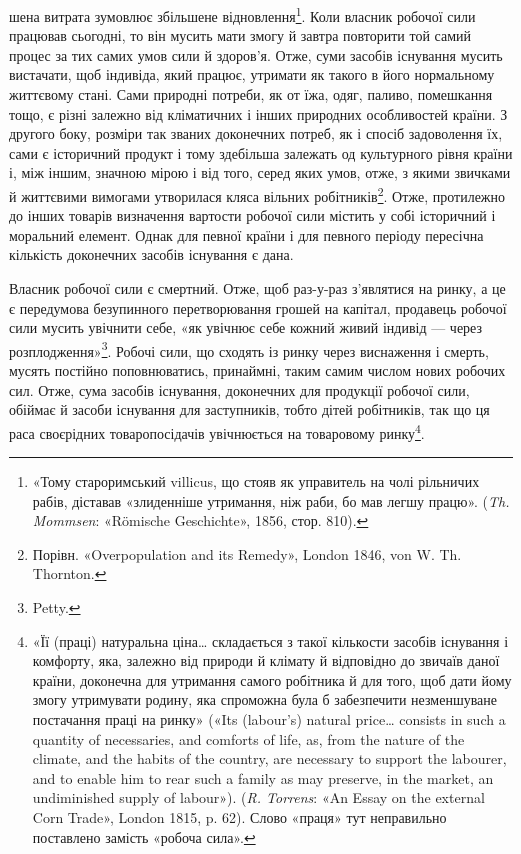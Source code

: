 \parcont{}  %
шена витрата зумовлює збільшене відновлення\footnote{
«Тому староримський villicus, що стояв як управитель на чолі
рільничих рабів, діставав «злиденніше утримання, ніж раби, бо мав
легшу працю». (\emph{Th. Mommsen}: «Römische Geschichte», 1856, стор. 810).
}. Коли власник
робочої сили працював сьогодні, то він мусить мати змогу й завтра
повторити той самий процес за тих самих умов сили й здоров’я.
Отже, суми засобів існування мусить вистачати, щоб індивіда,
який працює, утримати як такого в його нормальному життєвому
стані. Сами природні потреби, як от їжа, одяг, паливо, помешкання
тощо, є різні залежно від кліматичних і інших природних
особливостей країни. З другого боку, розміри так званих доконечних
потреб, як і спосіб задоволення їх, сами є історичний
продукт і тому здебільша залежать од культурного рівня країни
і, між іншим, значною мірою і від того, серед яких умов, отже,
з якими звичками й життєвими вимогами утворилася кляса вільних
робітників\footnote{
Порівн. «Overpopulation and its Remedy», London 1846, von W. Th.
Thornton.
}. Отже, протилежно до інших товарів визначення
вартости робочої сили містить у собі історичний і моральний
елемент. Однак для певної країни і для певного періоду пересічна
кількість доконечних засобів існування є дана.

Власник робочої сили є смертний. Отже, щоб раз-у-раз
з’являтися на ринку, а це є передумова безупинного перетворювання
грошей на капітал, продавець робочої сили мусить увічнити
себе, «як увічнює себе кожний живий індивід — через
розплодження»\footnote{
Petty.
}. Робочі сили, що сходять із ринку через виснаження
і смерть, мусять постійно поповнюватись, принаймні,
таким самим числом нових робочих сил. Отже, сума засобів
існування, доконечних для продукції робочої сили, обіймає й
засоби існування для заступників, тобто дітей робітників, так
що ця раса своєрідних товаропосідачів увічнюється на товаровому
ринку\footnote{
«Її (праці) натуральна ціна\dots{} складається з такої кількости засобів
існування і комфорту, яка, залежно від природи й клімату й відповідно
до звичаїв даної країни, доконечна для утримання самого робітника
й для того, щоб дати йому змогу утримувати родину, яка спроможна
була б забезпечити незменшуване постачання праці на ринку» («Its
(labour’s) natural price\dots{} consists in such a quantity of necessaries, and
comforts of life, as, from the nature of the climate, and the habits of the
country, are necessary to support the labourer, and to enable him to rear
such a family as may preserve, in the market, an undiminished supply of
labour»). (\emph{R. Torrens}: «An Essay on the external Corn Trade», London
1815, p. 62). Слово «праця» тут неправильно поставлено замість «робоча
сила».
}.

